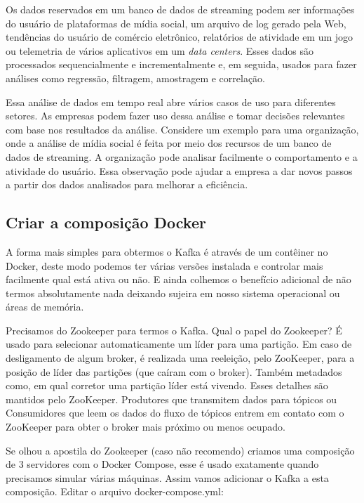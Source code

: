 \documentclass[a4paper,11pt]{article}
\begin{document}
Os dados reservados em um banco de dados de streaming podem ser informações do usuário de plataformas de mídia social, um arquivo de log gerado pela Web, tendências do usuário de comércio eletrônico, relatórios de atividade em um jogo ou telemetria de vários aplicativos em um \textit{data centers}. Esses dados são processados sequencialmente e incrementalmente e, em seguida, usados para fazer análises como regressão, filtragem, amostragem e correlação.

Essa análise de dados em tempo real abre vários casos de uso para diferentes setores. As empresas podem fazer uso dessa análise e tomar decisões relevantes com base nos resultados da análise. Considere um exemplo para uma organização, onde a análise de mídia social é feita por meio dos recursos de um banco de dados de streaming. A organização pode analisar facilmente o comportamento e a atividade do usuário. Essa observação pode ajudar a empresa a dar novos passos a partir dos dados analisados para melhorar a eficiência. 

\subsection{Criar a composição Docker}
A forma mais simples para obtermos o Kafka é através de um contêiner no Docker, deste modo podemos ter várias versões instalada e controlar mais facilmente qual está ativa ou não. E ainda colhemos o benefício adicional de não termos absolutamente nada deixando sujeira em nosso sistema operacional ou áreas de memória.

Precisamos do Zookeeper para termos o Kafka. Qual o papel do Zookeeper? É usado para selecionar automaticamente um líder para uma partição. Em caso de desligamento de algum broker, é realizada uma reeleição, pelo ZooKeeper, para a posição de líder das partições (que caíram com o broker). Também metadados como, em qual corretor uma partição líder está vivendo. Esses detalhes são mantidos pelo ZooKeeper. Produtores que transmitem dados para tópicos ou Consumidores que leem os dados do fluxo de tópicos entrem em contato com o ZooKeeper para obter o broker mais próximo ou menos ocupado. 

Se olhou a apostila do Zookeeper (caso não recomendo) criamos uma composição de 3 servidores com o Docker Compose, esse é usado exatamente quando precisamos simular várias máquinas. Assim vamos adicionar o Kafka a esta composição. Editar o arquivo docker-compose.yml: \\
\end{document}
